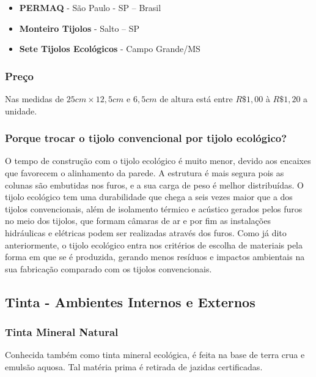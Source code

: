 	\begin{itemize}

		\item \textbf{PERMAQ} - São Paulo - SP – Brasil

		\item \textbf{Monteiro Tijolos} - Salto – SP

		\item \textbf{Sete Tijolos Ecológicos} - Campo Grande/MS

	\end{itemize}

\subsubsection*{\textbf{Preço}}

	Nas medidas de $25 cm \times 12,5 cm$ e $6,5 cm$ de altura está entre $R\$ 1,00$ à $R\$ 1,20$ a unidade.

\subsubsection*{\textbf{Porque trocar o tijolo convencional por tijolo ecológico?}}

	O tempo de construção com o tijolo ecológico é muito menor, devido aos encaixes que favorecem o alinhamento da parede. A estrutura é mais segura pois as colunas são embutidas nos furos, e a sua carga de peso é melhor distribuídas. O tijolo ecológico tem uma durabilidade que chega a seis vezes maior que a dos tijolos convencionais, além de isolamento térmico e acústico gerados pelos furos no meio dos tijolos, que formam câmaras de ar e por fim as instalações hidráulicas e elétricas podem ser realizadas através dos furos. Como já dito anteriormente, o tijolo ecológico entra nos critérios de escolha de materiais pela forma em que se é produzida, gerando menos resíduos e impactos ambientais na sua fabricação comparado com os tijolos convencionais.

\subsection{Tinta - Ambientes Internos e Externos }

\subsubsection*{\textbf{Tinta Mineral Natural}}
	
	Conhecida também como tinta mineral ecológica, é feita na base de terra crua e emulsão aquosa. Tal matéria prima é retirada de jazidas certificadas\cite{EcoCasa}.


